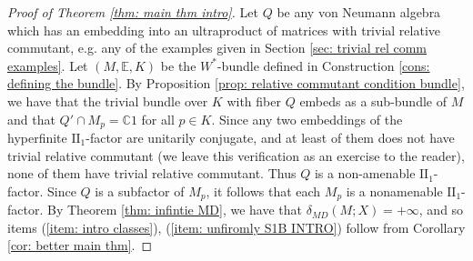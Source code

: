 \documentclass[10pt]{amsart}
\theoremstyle{definition}
\numberwithin{equation}{section}
\newcommand{\bC}{{\mathbb C}}
\newcommand{\bE}{{\mathbb E}}
\begin{document}
\begin{proof}[Proof of Theorem \ref{thm: main thm intro}]
Let $Q$ be any von Neumann algebra which has an embedding into an ultraproduct of matrices with trivial relative commutant, e.g. any of the examples given in Section \ref{sec: trivial rel comm examples}.
Let $(M,\bE,K)$ be the $W^{*}$-bundle defined in Construction \ref{cons: defining the bundle}. By Proposition \ref{prop: relative commutant condition bundle}, we have that the trivial bundle over $K$ with fiber $Q$ embeds as a sub-bundle of $M$ and that $Q'\cap M_{p}=\bC1$ for all $p\in K$. 
Since any two embeddings of the hyperfinite $\textrm{II}_{1}$-factor are unitarily conjugate, and at least of them does not have trivial relative commutant (we leave this verification as an exercise to the reader), none of them have trivial relative commutant. Thus $Q$ is a non-amenable $\textrm{II}_{1}$-factor. Since $Q$ is a subfactor of $M_{p}$, it follows that each $M_{p}$ is a nonamenable $\textrm{II}_{1}$-factor. 
By Theorem \ref{thm: infintie MD}, we have that $\delta_{MD}(M;X)=+\infty$, and so items (\ref{item: intro classes}), (\ref{item: unfiromly S1B INTRO}) follow from Corollary \ref{cor: better main thm}.


\end{proof}

\end{document}
